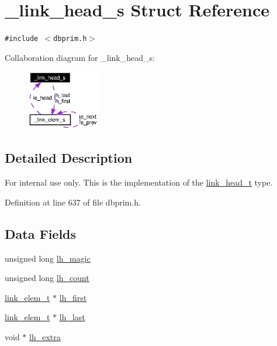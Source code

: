\hypertarget{struct__link__head__s}{
\section{\_\-link\_\-head\_\-s Struct Reference}
\label{struct__link__head__s}
}
{\tt \#include $<$dbprim.h$>$}

Collaboration diagram for \_\-link\_\-head\_\-s:\begin{figure}[H]
\begin{center}
\leavevmode
\includegraphics[width=90pt]{struct__link__head__s__coll__graph}
\end{center}
\end{figure}


\subsection{Detailed Description}
\begin{Desc}
\item[For internal use only.]
This is the implementation of the \hyperlink{group__dbprim__link_ga0}{link\_\-head\_\-t} type.\end{Desc}




Definition at line 637 of file dbprim.h.\subsection*{Data Fields}
\begin{CompactItemize}
\item 
unsigned long \hyperlink{struct__link__head__s_o0}{lh\_\-magic}
\item 
unsigned long \hyperlink{struct__link__head__s_o1}{lh\_\-count}
\item 
\hyperlink{struct__link__elem__s}{link\_\-elem\_\-t} $\ast$ \hyperlink{struct__link__head__s_o2}{lh\_\-first}
\item 
\hyperlink{struct__link__elem__s}{link\_\-elem\_\-t} $\ast$ \hyperlink{struct__link__head__s_o3}{lh\_\-last}
\item 
void $\ast$ \hyperlink{struct__link__head__s_o4}{lh\_\-extra}
\end{CompactItemize}


